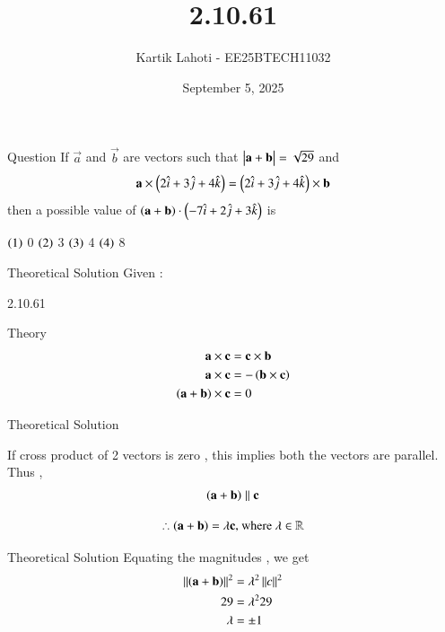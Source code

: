 \documentclass{beamer}
\title %
{2.10.61}
\date{September 5, 2025}
\author 
{Kartik Lahoti - EE25BTECH11032}
\begin{document}
\frame{\titlepage}
\begin{frame}{Question}
If $\vec{a}$ and $\vec{b}$ are vectors such that $\begin{vmatrix}\mathbf{a} + \mathbf{b}\end{vmatrix} = \sqrt{29}$ and
\begin{align*}
    \mathbf{a} \times \left(2\hat{i} + 3\hat{j} + 4\hat{k}\right) = \left(2\hat{i} + 3\hat{j} + 4\hat{k}\right) \times \mathbf{b}
\end{align*}
then a possible value of $\left(\mathbf{a}+\mathbf{b}\right)\cdot\left(-7\hat{i} + 2\hat{j} + 3\hat{k}\right)$ is 


  $\left(1\right)$ 0 \hspace{2cm} $\left(2\right)$ 3 \hspace{2cm} $\left(3\right)$ 4 \hspace{2cm} $\left(4\right)$ 8
\end{frame}



\begin{frame}{Theoretical Solution}
Given :
\begin{table}[H]
    \centering
    
    \caption{2.10.61}
    \label{tab:placeholder_1}
\end{table}
\end{frame}

\begin{frame}{Theory}
\begin{align}
    \mathbf{a} \times \mathbf{c} &= \mathbf{c} \times \mathbf{b}\\
    \mathbf{a} \times \mathbf{c} &= - \left(\mathbf{b} \times \mathbf{c}\right) \\
    \left(\mathbf{a} + \mathbf{b}\right) \times \mathbf{c} &= 0  
\end{align}
\end{frame}
\begin{frame}{Theoretical Solution}

If cross product of 2 vectors is zero ,  this implies both the vectors are parallel. 
Thus , 
\begin{align}
    \left(\mathbf{a} + \mathbf{b}\right) \parallel \mathbf{c} 
\end{align}

\begin{align}
   \therefore\left(\mathbf{a} + \mathbf{b}\right) = \lambda\mathbf{c}  \text{, where } \lambda \in \mathbb{R}
\end{align}

\end{frame}

\begin{frame}{Theoretical Solution}
Equating the magnitudes , we get 
\begin{align}
    \left\lVert\left(\mathbf{a} + \mathbf{b}\right)\right\rVert^2 &= \lambda^2 \left\lVert c\right\rVert^2 \\
    29 &= \lambda^2 29 \\ 
    \lambda &= \pm 1 
 \end{align}
\end{frame}
\end{document}
